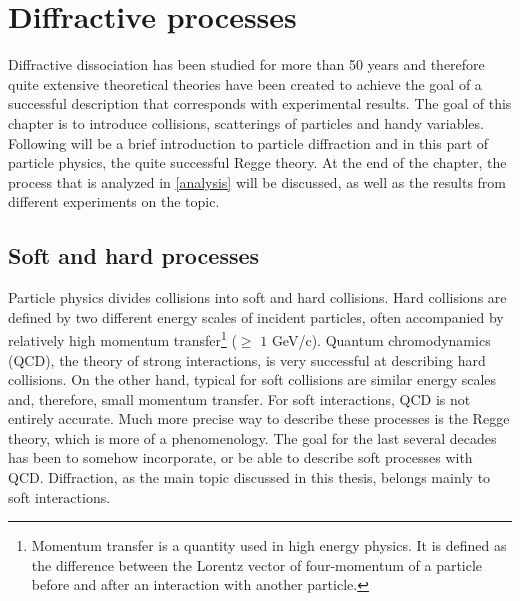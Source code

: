 \chapter{Diffractive processes}
\label{theoretics}

Diffractive dissociation has been studied for more than 50 years and therefore quite extensive theoretical theories have been created to achieve the goal of a successful description that corresponds with experimental results. The goal of this chapter is to introduce collisions, scatterings of particles and handy variables. Following will be a brief introduction to particle diffraction and in this part of particle physics, the quite successful Regge theory. At the end of the chapter, the process that is analyzed in \autoref{analysis} will be discussed, as well as the results from different experiments on the topic.

\section{Soft and hard processes}
Particle physics divides collisions into soft and hard collisions. Hard collisions are defined by two different energy scales of incident particles, often accompanied by relatively high momentum transfer\footnote{Momentum transfer is a quantity used in high energy physics. It is defined as the difference between the Lorentz vector of four-momentum of a particle before and after an interaction with another particle.} ($\geq$ $1$ GeV/c). Quantum chromodynamics (QCD), the theory of strong interactions, is very successful at describing hard collisions. On the other hand, typical for soft collisions are similar energy scales and, therefore, small momentum transfer. For soft interactions, QCD is not entirely accurate. Much more precise way to describe these processes is the Regge theory, which is more of a phenomenology\cite{Barone}. The goal for the last several decades has been to somehow incorporate, or be able to describe soft processes with QCD. Diffraction, as the main topic discussed in this thesis, belongs mainly to soft interactions. 
